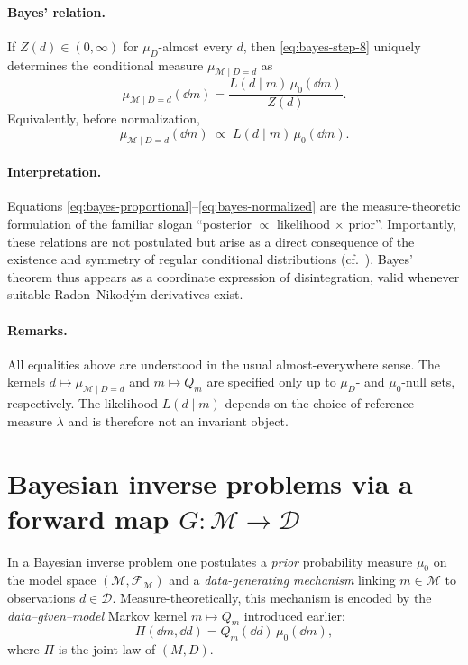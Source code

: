 \documentclass[11pt]{article}
\theoremstyle{remark}
\newcommand{\modelspace}{\mathcal{M}}
\newcommand{\dataspace}{\mathcal{D}}
\begin{document}
\paragraph{Bayes' relation.}
If \(Z(d)\in(0,\infty)\) for \(\mu_D\)-almost every \(d\), then
\eqref{eq:bayes-step-8} uniquely determines the conditional measure
\(\mu_{\modelspace\mid D=d}\) as
\begin{equation}\label{eq:bayes-normalized}
  \mu_{\modelspace\mid D=d}(\dd m)
  =
  \frac{L(d\mid m)\,\mu_0(\dd m)}{Z(d)}.
\end{equation}
Equivalently, before normalization,
\begin{equation}\label{eq:bayes-proportional}
  \mu_{\modelspace\mid D=d}(\dd m)
  \;\propto\;
  L(d\mid m)\,\mu_0(\dd m).
\end{equation}

\paragraph{Interpretation.}
Equations \eqref{eq:bayes-proportional}--\eqref{eq:bayes-normalized} are the
measure-theoretic formulation of the familiar slogan
``posterior \(\propto\) likelihood \(\times\) prior''.  Importantly, these
relations are not postulated but arise as a direct consequence of the
existence and symmetry of regular conditional distributions
(cf.~\cite[Chapter~5]{Kallenberg2021}).  Bayes' theorem thus appears as a
coordinate expression of disintegration, valid whenever suitable
Radon--Nikodým derivatives exist.


\paragraph{Remarks.}
All equalities above are understood in the usual almost-everywhere sense.
The kernels \(d\mapsto\mu_{\modelspace\mid D=d}\) and
\(m\mapsto Q_m\) are specified only up to \(\mu_D\)- and \(\mu_0\)-null sets,
respectively.  The likelihood \(L(d\mid m)\) depends on the choice of
reference measure \(\lambda\) and is therefore not an invariant object.

\section{Bayesian inverse problems via a forward map \(G:\modelspace\to\dataspace\)}
\label{sec:bayes-inversion-forward}

In a Bayesian inverse problem one postulates a \emph{prior} probability measure
\(\mu_0\) on the model space \((\modelspace,\mathcal{F}_{\modelspace})\) and a
\emph{data-generating mechanism} linking \(m\in\modelspace\) to observations
\(d\in\dataspace\).  Measure-theoretically, this mechanism is encoded by the
\emph{data--given--model} Markov kernel \(m\mapsto Q_m\) introduced earlier:
\[
\Pi(\dd m,\dd d)=Q_m(\dd d)\,\mu_0(\dd m),
\]
where \(\Pi\) is the joint law of \((M,D)\).
\end{document}
